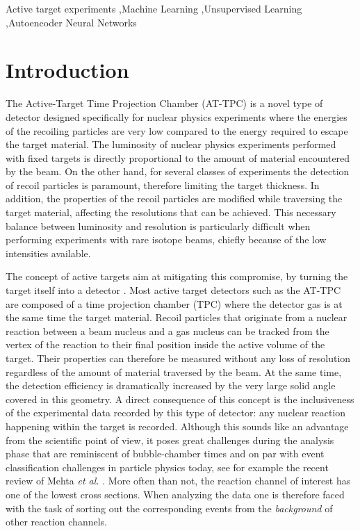 \documentclass[preprint,12pt]{elsarticle}
\begin{document}
\begin{frontmatter}
\begin{keyword}
Active target experiments \sep Machine Learning \sep Unsupervised Learning \sep Autoencoder Neural Networks



\end{keyword}

\end{frontmatter}

\section{Introduction}\label{sec:intro}



The Active-Target Time Projection Chamber (AT-TPC) \cite{Bradt2017} is a novel type of detector designed specifically for nuclear physics experiments where the energies of the recoiling particles are very low compared to the energy required to escape the target material. The luminosity of nuclear physics experiments performed with fixed targets is directly proportional to the amount of material encountered by the beam. On the other hand, for several classes of experiments the detection of recoil particles is paramount, therefore limiting the target thickness. In addition, the properties of the recoil particles are modified while traversing the target material, affecting the resolutions that can be achieved. This necessary balance between luminosity and resolution is particularly difficult when performing experiments with rare isotope beams, chiefly because of the low intensities available. 

The concept of active targets aim at mitigating this compromise, by turning the target itself into a detector \cite{BECEIRONOVO2015}. Most active target detectors such as the AT-TPC are composed of a time projection chamber (TPC) where the detector gas is at the same time the target material. Recoil particles that originate from a nuclear reaction between a beam nucleus and a gas nucleus can be tracked from the vertex of the reaction to their final position inside the active volume of the target. Their properties can therefore be measured without any loss of resolution regardless of the amount of material traversed by the beam. At the same time, the detection efficiency is dramatically increased by the very large solid angle covered in this geometry. A direct consequence of this concept is the inclusiveness of the experimental data recorded by this type of detector: any nuclear reaction happening within the target is recorded. Although this sounds like an advantage from the scientific point of view, it poses great challenges during the analysis phase that are reminiscent 
of bubble-chamber times and on par with event classification challenges in particle physics today, see for example the recent review of Mehta {\em et al.} \cite{mehta2019}. More often than not, the reaction channel of interest has one of the lowest cross sections. When analyzing the data one is therefore faced with the task of sorting out the corresponding events from the {\em background} of other reaction channels. 
\end{document}
